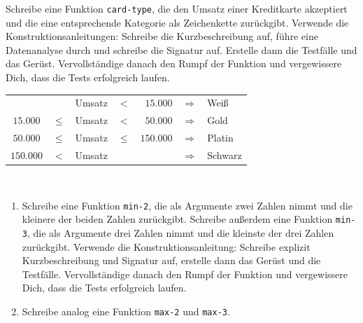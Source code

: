 \begin{aufgabe}
  Schreibe eine Funktion \lstinline{card-type}, die den Umsatz einer
  Kreditkarte akzeptiert und die eine entsprechende Kategorie als
  Zeichenkette zurückgibt.  Verwende die Konstruktionsanleitungen:
  Schreibe die Kurzbeschreibung auf, führe eine
  Datenanalyse durch und schreibe die Signatur auf. Erstelle
  dann die Testfälle und das Gerüst.  Vervollständige danach den
  Rumpf der Funktion und vergewissere Dich, dass die Tests
  erfolgreich laufen. \\

  \begin{tabular}{crlcrll}
    &        & Umsatz & $<$ & $15.000$   & $\Longrightarrow$ & Weiß \\
    $15.000$  & $\leq$ & Umsatz & $<$ & $50.000 $  & $\Longrightarrow$ & Gold \\
    $50.000$  & $\leq$ & Umsatz & $\leq$ & $150.000 $ 
    & $\Longrightarrow$ & Platin \\
    $150.000$ & $<$ & Umsatz &     &            &  $\Longrightarrow$ & Schwarz \\
  \end{tabular} \\
\end{aufgabe}

\begin{aufgabe}

  \begin{enumerate}

  \item Schreibe eine Funktion \lstinline{min-2}, die als Argumente zwei
    Zahlen nimmt und die kleinere der beiden Zahlen zurückgibt.  Schreibe
    außerdem eine Funktion \lstinline{min-3}, die als Argumente drei
    Zahlen nimmt und die kleinste der drei Zahlen zurückgibt.  Verwende
    die Konstruktionsanleitung: Schreibe
    explizit Kurzbeschreibung und Signatur auf, erstelle dann das
    Gerüst und die Testfälle.  Vervollständige danach den Rumpf der
    Funktion und vergewissere Dich, dass die Tests erfolgreich laufen.
    
  \item Schreibe analog eine Funktion \lstinline{max-2} und \lstinline{max-3}.
    
  \end{enumerate}
\end{aufgabe}

